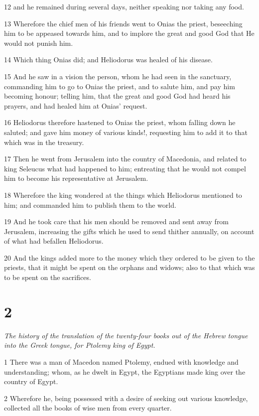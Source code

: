 12 and he remained during several days, neither speaking nor taking any food. 

13 Wherefore the chief men of his friends went to Onias the priest, beseeching him to be appeased towards him, and to implore the great and good God that He would not punish him. 

14 Which thing Onias did; and Heliodorus was healed of his disease. 

15 And he saw in a vision the person, whom he had seen in the sanctuary, commanding him to go to Onias the priest, and to salute him, and pay him becoming honour; telling him, that the great and good God had heard his prayers, and had healed him at Onias’ request. 

16 Heliodorus therefore hastened to Onias the priest, whom falling down he saluted; and gave him money of various kinds!, requesting him to add it to that which was in the treasury. 

17 Then he went from Jerusalem into the country of Macedonia, and related to king Seleucus what had happened to him; entreating that he would not compel him to become his representative at Jerusalem. 

18 Wherefore the king wondered at the things which Heliodorus mentioned to him; and commanded him to publish them to the world. 

19 And he took care that his men should be removed and sent away from Jerusalem, increasing the gifts which he used to send thither annually, on account of what had befallen Heliodorus. 

20 And the kings added more to the money which they ordered to be given to the priests, that it might be spent on the orphans and widows; also to that which was to be spent on the sacrifices. 

\chapter{2}

\par \textit{The history of the translation of the twenty-four books out of the Hebrew tongue into the Greek tongue, for Ptolemy king of Egypt.}

1 There was a man of Macedon named Ptolemy, endued with knowledge and understanding; whom, as he dwelt in Egypt, the Egyptians made king over the country of Egypt. 

2 Wherefore he, being possessed with a desire of seeking out various knowledge, collected all the books of wise men from every quarter. 

